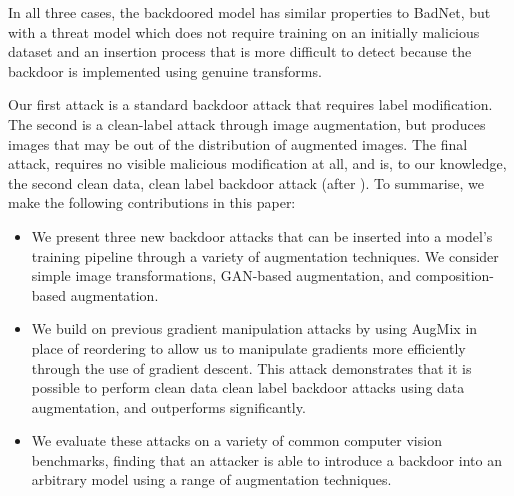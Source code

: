 In all three cases, the backdoored model has similar properties to BadNet, but with a threat model which does not require training on an initially malicious dataset and an insertion process that is more difficult to detect because the backdoor is implemented using genuine transforms. 

Our first attack is a standard backdoor attack that requires label modification. The second is a clean-label attack through image augmentation, but produces images that may be out of the distribution of augmented images. The final attack, requires no visible malicious modification at all, and is, to our knowledge, the second clean data, clean label backdoor attack (after \cite{bob}).
To summarise, we make the following contributions in this paper:

\begin{itemize}
  \item We present three new backdoor attacks that can be inserted into a model's training pipeline through a variety of augmentation techniques. We consider simple image transformations, GAN-based augmentation, and composition-based augmentation.
  \item We build on previous gradient manipulation attacks by using AugMix in place of reordering to allow us to manipulate gradients more efficiently through the use of gradient descent. This attack demonstrates that it is possible to perform clean data clean label backdoor attacks using data augmentation, and outperforms \citet{bob} significantly.
  \item We evaluate these attacks on a variety of common computer vision benchmarks, finding that an attacker is able to introduce a backdoor into an arbitrary model using a range of augmentation techniques.
\end{itemize}